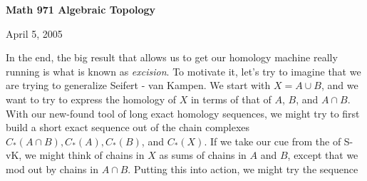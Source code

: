 \def\ccy{\Cyan}		  %
\def\cpb{\ProcessBlue}	  %
\def\csb{\SkyBlue}	  %
\def\ctu{\Turquoise}	  %
\def\ctb{\TealBlue}	  %
\def\caq{\Aquamarine}	  %
\def\cbg{\BlueGreen}	  %
\def\cem{\Emerald}	  %
\def\csg{\SeaGreen}	  %
\def\cgg{\Green}	  %
\def\cfg{\ForestGreen}	  %
\def\cpg{\PineGreen}	  %
\def\clg{\LimeGreen}	  %
\def\cyg{\YellowGreen}	  %
\def\cspg{\SpringGreen}	  %
\def\cog{\OliveGreen}	  %
\def\pars{\RawSienna}	  %
\def\cse{\Sepia}		  %
\def\cbr{\Brown}		  %
\def\cta{\Tan}		  %
\def\cgr{\Gray}		  %
\def\cbl{\Black}		  %
\def\cwh{\White}		  %


\loadmsbm



\def\ctln{\centerline}
\def\u{\underbar}
\def\ssk{\smallskip}
\def\msk{\medskip}
\def\bsk{\bigskip}
\def\hsk{\hskip.1in}
\def\hhsk{\hskip.2in}
\def\dsl{\displaystyle}
\def\hskp{\hskip1.5in}

\def\lra{$\Leftrightarrow$ }
\def\ra{\rightarrow}
\def\mpto{\logmapsto}
\def\pu{\pi_1}
\def\mpu{$\pi_1$}
\def\sig{\Sigma}
\def\msig{$\Sigma$}
\def\ep{\epsilon}
\def\sset{\subseteq}
\def\del{\partial}
\def\inv{^{-1}}
\def\wtl{\widetilde}
\def\lra{\Leftrightarrow}
\def\del{\partial}
\def\delp{\partial^\prime}
\def\delpp{\partial^{\prime\prime}}
\def\sgn{{\roman{sgn}}}
\def\wtih{\widetilde{H}}



\ctln{\bf Math 971 Algebraic Topology}

\ssk

\ctln{April 5, 2005}

\msk

In the end, the big result that allows us to get our homology machine really running is what is
known as {\it excision}. To motivate it, let's try to imagine that we are trying to 
generalize Seifert - van Kampen. We start with $X=A\cup B$, and we want to try to 
express the homology of $X$ in terms of that of $A$, $B$, and $A\cap B$. With our
new-found tool of long exact homology sequences, we might try to first build
a short exact sequence out of the chain complexes $C_*(A\cap B), C_*(A), C_*(B)$, and $C_*(X)$.
If we take our cue from the \u{proof} of S-vK, we might think of chains in $X$ as sums of 
chains in $A$ and $B$, except that we mod out by chains in $A\cap B$. Putting this into action,
we might try the sequence

